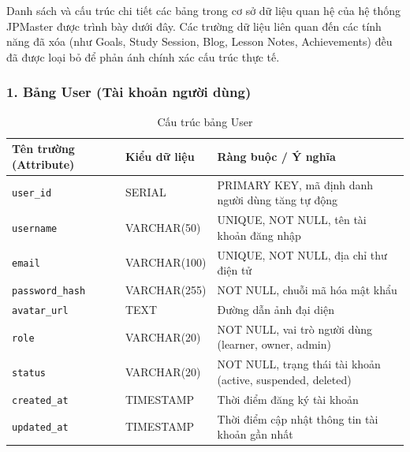 \documentclass[../DoAn.tex]{subfiles}
\begin{document}
Danh sách và cấu trúc chi tiết các bảng trong cơ sở dữ liệu quan hệ của hệ thống JPMaster được trình bày dưới đây. Các trường dữ liệu liên quan đến các tính năng đã xóa (như Goals, Study Session, Blog, Lesson Notes, Achievements) đều đã được loại bỏ để phản ánh chính xác cấu trúc thực tế.

\subsubsection*{1. Bảng User (Tài khoản người dùng)}
\begin{table}[H]
\centering
\footnotesize
\renewcommand{\arraystretch}{1.2}
\begin{tabular}{|p{4.2cm}|p{3.2cm}|p{7.1cm}|}
\hline
\textbf{Tên trường (Attribute)} & \textbf{Kiểu dữ liệu} & \textbf{Ràng buộc / Ý nghĩa} \\
\hline
\texttt{user\_id} & SERIAL & PRIMARY KEY, mã định danh người dùng tăng tự động \\
\hline
\texttt{username} & VARCHAR(50) & UNIQUE, NOT NULL, tên tài khoản đăng nhập \\
\hline
\texttt{email} & VARCHAR(100) & UNIQUE, NOT NULL, địa chỉ thư điện tử \\
\hline
\texttt{password\_hash} & VARCHAR(255) & NOT NULL, chuỗi mã hóa mật khẩu \\
\hline
\texttt{avatar\_url} & TEXT & Đường dẫn ảnh đại diện \\
\hline
\texttt{role} & VARCHAR(20) & NOT NULL, vai trò người dùng (learner, owner, admin) \\
\hline
\texttt{status} & VARCHAR(20) & NOT NULL, trạng thái tài khoản (active, suspended, deleted) \\
\hline
\texttt{created\_at} & TIMESTAMP & Thời điểm đăng ký tài khoản \\
\hline
\texttt{updated\_at} & TIMESTAMP & Thời điểm cập nhật thông tin tài khoản gần nhất \\
\hline
\end{tabular}
\caption{Cấu trúc bảng User}
\label{tab:schema_user}
\end{table}
\end{document}

